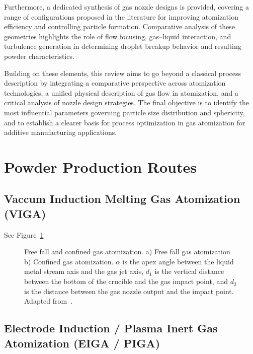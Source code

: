 \documentclass[final,5p,times,twocolumn]{elsarticle}
\begin{document}
Furthermore, a dedicated synthesis of gas nozzle designs is provided, covering a range of configurations proposed in the literature for improving atomization efficiency and controlling particle formation. Comparative analysis of these geometries highlights the role of flow focusing, gas–liquid interaction, and turbulence generation in determining droplet breakup behavior and resulting powder characteristics.

Building on these elements, this review aims to go beyond a classical process description by integrating a comparative perspective across atomization technologies, a unified physical description of gas flow in atomization, and a critical analysis of nozzle design strategies. The final objective is to identify the most influential parameters governing particle size distribution and sphericity, and to establish a clearer basis for process optimization in gas atomization for additive manufacturing applications.

\section{Powder Production Routes}
\label{s:Powder_Production_Routes}


\subsection{Vaccum Induction Melting Gas Atomization (VIGA)}
\label{s:VIGA}

See Figure~\ref{f:free_fall_confined}

\begin{figure}
    \centering
        
        \caption[Free fall and confined gas atomization]{Free fall and confined gas atomization. a) Free fall gas atomization b) Confined gas atomization. $\alpha$ is the apex angle between the liquid metal stream axis and the gas jet axis, $d_{1}$ is the vertical distance between the bottom of the crucible and the gas impact point, and $d_{2}$ is the distance between the gas nozzle output and the impact point. Adapted from~\cite{Goudar2017EffectAtomization}.}
        \label{f:free_fall_confined}
\end{figure}

\subsection{Electrode Induction / Plasma Inert Gas Atomization (EIGA / PIGA)}
\label{s:EIGA_PIGA}
\end{document}
